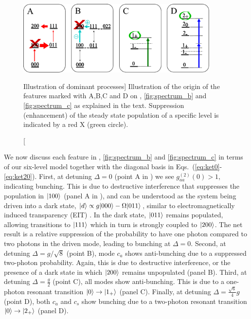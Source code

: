 \begin{figure}
\centering
  \includegraphics[width=0.9\textwidth]{./figs_Komar2013/fig2d.pdf}
  \caption
  [Illustration of dominant processes]
  {
  \label{fig:spectrum_d}
  Illustration of the origin of the features marked with A,B,C and D on
  , \ref{fig:spectrum_b} and \ref{fig:spectrum_c} as
  explained in the text.
  Suppression  (enhancement) of the
  steady state population of a specific level is
  indicated by a red X (green circle).
  }
\end{figure}
We now discuss each feature
in , \ref{fig:spectrum_b} and \ref{fig:spectrum_c} in
terms of our six-level model together with the diagonal basis
in Eqs.~(\ref{eq:ket0}-\ref{eq:ket20}).
First, at 
detuning $\Delta = 0$ (point A in )
we see $g^{(2)}_{aa}(0)>1$, indicating bunching.  
This is due to destructive interference that
suppresses
the population in  $| 100 \rangle$ 
(panel A in ), and
can be understood as the system being
driven into a dark state,
$| d \rangle \propto g | 000 \rangle - \Omega | 011 \rangle$, similar to
electromagnetically induced 
transparency (EIT) \cite{Lukin2003, Weis2010}.
In the dark state, $| 011 \rangle$ remains populated,
allowing transitions to $| 111 \rangle$
which in turn is strongly coupled to
$| 200 \rangle$.
The net result is a relative 
suppression of the probability to have one photon
compared to two photons
in the driven mode, 
leading to bunching at $\Delta = 0$.
Second, at detuning $\Delta = g/\sqrt{8}$ 
(point B), 
mode $c_a$ shows anti-bunching
due to a suppressed two-photon probability.
Again, this is due to destructive interference, or
the presence of a dark state in which
$| 200 \rangle$ remains unpopulated
(panel B).
Third, at detuning $\Delta = \frac{g}{2}$ 
(point C), 
all  modes show anti-bunching.
This is due to
a one-photon  resonant transition
$| 0 \rangle \rightarrow | 1_+ \rangle$ 
(panel C).
Finally, at detuning $\Delta = \frac{\sqrt{6}}{4}g$ 
(point D), 
both $c_a$ and $c_s$ show bunching due
to a two-photon resonant transition
$| 0 \rangle \rightarrow | 2_+ \rangle$
(panel D).



